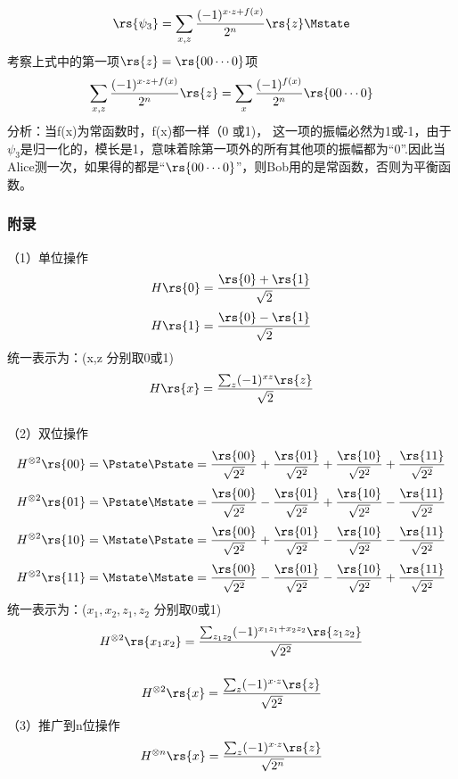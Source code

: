 \begin{frame}
    \frametitle{}
    \[
    \rs{\psi_3}=\sum\limits_{x,z} \dfrac{(-1)^{x\cdot z+f(x)}}{2^n}\rs{z} \Mstate 
    \]
    考察上式中的第一项$\rs{z}=\rs{00\cdots 0}$项\\
    \[\sum\limits_{x,z} \dfrac{(-1)^{x\cdot z+f(x)}}{2^n}\rs{z}=\sum\limits_{x} \dfrac{(-1)^{f(x)}}{2^n}\rs{00\cdots0}\]
    分析：当f(x)为常函数时，f(x)都一样（0 或1)， 这一项的振幅必然为1或-1，由于$\psi_3$是归一化的，模长是1，意味着除第一项外的所有其他项的振幅都为“0”.因此当Alice测一次，如果得的都是“$\rs{00\cdots0}$”，则Bob用的是常函数，否则为平衡函数。
\end{frame}

\begin{frame}
    \frametitle{附录}
    （1）单位操作
    \[H \rs{0}=\frac{\rs{0}+\rs{1}}{\sqrt{2}}\]
    \[H \rs{1}=\frac{\rs{0}-\rs{1}}{\sqrt{2}}\]
    {\Bullet} 统一表示为：(x,z 分别取0或1)\\
    \[H \rs{x}=\frac{\sum_z(-1)^{xz}\rs{z}}{\sqrt{2}}\]
\end{frame}

\begin{frame}
    \frametitle{}
    （2）双位操作
    \[H^{\otimes 2} \rs{00}=\Pstate\Pstate=\frac{\rs{00}}{\sqrt{2^2}}+\frac{\rs{01}}{\sqrt{2^2}}+ \frac{\rs{10}}{\sqrt{2^2}}+ \frac{\rs{11}}{\sqrt{2^2}}\]
    \[H^{\otimes 2} \rs{01}=\Pstate\Mstate=\frac{\rs{00}}{\sqrt{2^2}}-\frac{\rs{01}}{\sqrt{2^2}}+ \frac{\rs{10}}{\sqrt{2^2}}- \frac{\rs{11}}{\sqrt{2^2}}\]
    \[H^{\otimes 2} \rs{10}=\Mstate\Pstate=\frac{\rs{00}}{\sqrt{2^2}}+\frac{\rs{01}}{\sqrt{2^2}}- \frac{\rs{10}}{\sqrt{2^2}}- \frac{\rs{11}}{\sqrt{2^2}}\]
    \[H^{\otimes 2} \rs{11}=\Mstate\Mstate=\frac{\rs{00}}{\sqrt{2^2}}-\frac{\rs{01}}{\sqrt{2^2}}- \frac{\rs{10}}{\sqrt{2^2}}+ \frac{\rs{11}}{\sqrt{2^2}}\]
    {\Bullet} 统一表示为：($x_1,x_2,z_1,z_2$ 分别取0或1)\\
    \[H^{\otimes 2} \rs{x_1x_2}=\frac{\sum_{z_1z_2}(-1)^{x_1z_1+x_2z_2}\rs{z_1z_2}}{\sqrt{2^2}}\]
\end{frame}

\begin{frame}
    \frametitle{}
    \[H^{\otimes 2} \rs{x}=\frac{\sum_{z}(-1)^{x\cdot z}\rs{z}}{\sqrt{2^2}}\]
    （3）推广到n位操作
    \[H^{\otimes n} \rs{x}=\frac{\sum_{z}(-1)^{x\cdot z}\rs{z}}{\sqrt{2^n}}\]
\end{frame}